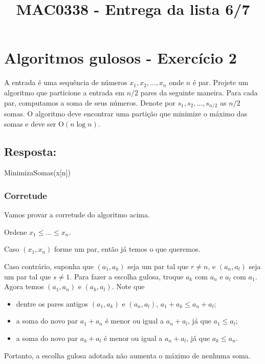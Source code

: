 \documentclass{article}
\title{MAC0338 - Entrega da lista 6/7}
\author{}
\date{}
\begin{document}
\maketitle

\section*{Algoritmos gulosos - Exercício 2}
A entrada é uma sequência de números $x_1, x_2, \dots, x_n$ onde $n$ é par.
Projete um algoritmo que particione a entrada em $n/2$ pares da seguinte maneira. Para cada par, computamos a soma de seus números. Denote por $s_1, s_2, \dots , s_{n/2}$ as $n/2$ somas. O algoritmo deve encontrar uma partição que minimize o máximo das somas e deve ser O$(n \log n)$.

\bigskip

\subsection*{Resposta:}

\begin{algorithm}
  \caption{MinimizaSomas(x[n])}
  \label{alg:MinimizaSomas}
\end{algorithm}

\subsubsection*{Corretude}
Vamos provar a corretude do algoritmo acima.

Ordene $x_1 \leq  \dots \leq x_n$.

Caso $(x_1, x_n)$ forme um par, então já temos o que queremos.

Caso contrário, suponha que $(a_1,a_k)$ seja um par tal que $r \neq n$, e $(a_n,a_l)$ seja um par tal que $s \neq 1$. Para fazer a escolha gulosa, troque $a_k$ com $a_n$ e $a_l$ com $a_1$. Agora temos $(a_1,a_n)$ e $(a_k,a_l)$. Note que
\begin{itemize}
  \item dentre os pares antigos $(a_1,a_k)$ e $(a_n,a_l)$, $a_1+a_k \leq a_n+a_l$;
  \item a soma do novo par $a_1+a_n$ é menor ou igual a $a_n+a_l$, já que $a_1 \leq a_l$;
  \item a soma do novo par $a_k+a_l$ é menor ou igual a $a_n+a_l$, já que $a_k \leq a_n$.
\end{itemize}
Portanto, a escolha gulosa adotada não aumenta o máximo de nenhuma soma.
\end{document}
